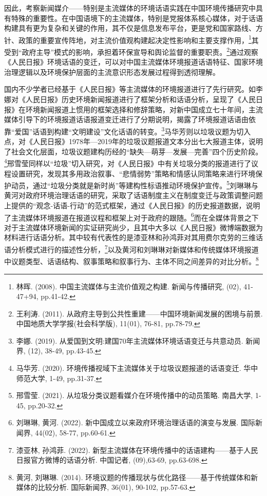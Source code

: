 因此，考察新闻媒介------特别是主流媒体的环境话语实践在中国环境传播研究中具有特殊的重要性。在中国语境下的主流媒体，特别是党报体系核心媒体，对于话语构建具有更为复杂和关键的作用，其不仅是信息发布平台，更是党和国家路线、方针、政策的重要宣传阵地，对主流价值观构建起决定性影响和主要支撑作用，\footnote{林晖.
  (2008). 中国主流媒体与主流价值观之构建. 新闻与传播研究, (02),
  41-47+94, pp.41-42.}其受到``政府主导''模式的影响，承担着环保宣导和舆论监督的重要职责。\footnote{王利涛.
  (2011). 从政府主导到公共性重建------中国环境新闻发展的困境与前景.
  中国地质大学学报(社会科学版), 11(01), 76-81, pp.78-79.}通过观察《人民日报》环境话语的变迁，可以对中国主流媒体环境报道话语特征、国家环境治理逻辑以及环境保护层面的主流意识形态发展过程得到透彻理解。

国内不少学者已经基于《人民日报》等主流媒体的环境报道进行了先行研究。如李娜对《人民日报》历史环境新闻报道进行了框架分析和话语分析，呈现了《人民日报》在环境新闻报道上惯用的框架选择和修辞策略，对新中国成立七十年间，主流媒体引导下的环境报道话语报道变迁进行了分期说明，揭露了环境报道话语由依靠``爱国''话语到构建``文明建设''文化话语的转变。\footnote{李娜.
  (2019). 从爱国到文明:建国70年主流媒体环境话语变迁与共意动员. 新闻界,
  (12), 38-49, pp.43-45.}马华芳则以垃圾议题为切入点，对《人民日报》1978年---2019年的垃圾议题报道文本分出七大报道主体，说明了社会文化层面，垃圾议题建构历经的``缺失---萌芽---发展---完善''四个历史阶段。\footnote{马华芳.
  (2020). 环境传播视域下主流媒体关于垃圾议题报道的话语变迁.
  华中师范大学, 1-49, pp.31-37.}邢雪莹同样以``垃圾''切入研究，对《人民日报》中有关垃圾分类的报道进行了议程设置研究，发现其多用政治叙事、``悲情弱势''策略和情感认同策略来进行环境保护动员，通过``垃圾分类就是新时尚''等建构性标语推动环境保护宣传。\footnote{邢雪莹.
  (2021). 从垃圾分类议题看媒介在环境传播中的动员策略. 南昌大学, 1-45,
  pp.20-32.}刘琳琳与黄河对政府环境治理话语的研究，采取了话语制度主义在制度变迁与政策调整问题上提供的``观念-话语-行动''的范式框架，通过《人民日报》的历史报道数据，说明了主流媒体环境报道在报道议程和框架上对于政府的跟随。\footnote{刘琳琳,
  黄河. (2022). 新中国成立以来政府环境治理话语的演变与发展. 国际新闻界,
  44(02), 58-77, pp.60-61.}而在全媒体背景之下对于主流媒体环境新闻的实证研究尚少，且其中大多以《人民日报》微博端数据为材料进行话语分析。其中较有代表性的是漆亚林和孙鸿菲对其用费尔克劳的三维话语分析模式进行的描述性分析，\footnote{漆亚林,
  孙鸿菲. (2022).
  新型主流媒体在环境传播中的话语建构------基于人民日报官方微博的话语分析.
  中国记者, (09),63-69, pp.63-698.}以及黄河和刘琳琳对新媒体和传统媒体环境报道中议题类型、话语结构、叙事策略和叙事行为、主体不同之间差异的对比分析。\footnote{黄河,
  刘琳琳. (2014).
  环境议题的传播现状与优化路径------基于传统媒体和新媒体的比较分析.
  国际新闻界, 36(01), 90-102, pp.57-63.}

